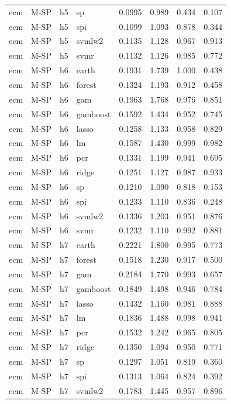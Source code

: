 \begin{ThreePartTable}
\begin{longtable}[t]{llclcccc}
ecm & M-SP & h5 & sp & 0.0995 & 0.989 & 0.434 & 0.107\\
ecm & M-SP & h5 & spi & 0.1099 & 1.093 & 0.878 & 0.344\\
ecm & M-SP & h5 & svmlw2 & 0.1135 & 1.128 & 0.967 & 0.913\\
ecm & M-SP & h5 & svmr & 0.1132 & 1.126 & 0.985 & 0.772\\
\addlinespace
ecm & M-SP & h6 & earth & 0.1931 & 1.739 & 1.000 & 0.438\\
ecm & M-SP & h6 & forest & 0.1324 & 1.193 & 0.912 & 0.458\\
ecm & M-SP & h6 & gam & 0.1963 & 1.768 & 0.976 & 0.851\\
ecm & M-SP & h6 & gamboost & 0.1592 & 1.434 & 0.952 & 0.745\\
ecm & M-SP & h6 & lasso & 0.1258 & 1.133 & 0.958 & 0.829\\
ecm & M-SP & h6 & lm & 0.1587 & 1.430 & 0.999 & 0.982\\
ecm & M-SP & h6 & pcr & 0.1331 & 1.199 & 0.941 & 0.695\\
ecm & M-SP & h6 & ridge & 0.1251 & 1.127 & 0.987 & 0.933\\
ecm & M-SP & h6 & sp & 0.1210 & 1.090 & 0.818 & 0.153\\
ecm & M-SP & h6 & spi & 0.1233 & 1.110 & 0.836 & 0.248\\
ecm & M-SP & h6 & svmlw2 & 0.1336 & 1.203 & 0.951 & 0.876\\
ecm & M-SP & h6 & svmr & 0.1232 & 1.110 & 0.992 & 0.881\\
\addlinespace
ecm & M-SP & h7 & earth & 0.2221 & 1.800 & 0.995 & 0.773\\
ecm & M-SP & h7 & forest & 0.1518 & 1.230 & 0.917 & 0.500\\
ecm & M-SP & h7 & gam & 0.2184 & 1.770 & 0.993 & 0.657\\
ecm & M-SP & h7 & gamboost & 0.1849 & 1.498 & 0.946 & 0.784\\
ecm & M-SP & h7 & lasso & 0.1432 & 1.160 & 0.981 & 0.888\\
ecm & M-SP & h7 & lm & 0.1836 & 1.488 & 0.998 & 0.941\\
ecm & M-SP & h7 & pcr & 0.1532 & 1.242 & 0.965 & 0.805\\
ecm & M-SP & h7 & ridge & 0.1350 & 1.094 & 0.950 & 0.771\\
ecm & M-SP & h7 & sp & 0.1297 & 1.051 & 0.819 & 0.360\\
ecm & M-SP & h7 & spi & 0.1313 & 1.064 & 0.824 & 0.392\\
ecm & M-SP & h7 & svmlw2 & 0.1783 & 1.445 & 0.957 & 0.896\\

\end{longtable}
\end{ThreePartTable}
